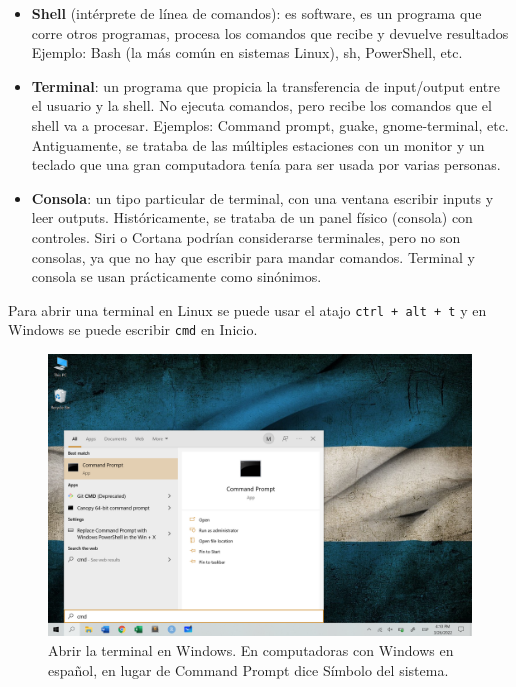 \documentclass[
]{book}
\providecommand{\tightlist}{%
  \setlength{\itemsep}{0pt}\setlength{\parskip}{0pt}}
\begin{document}
\begin{itemize}
\tightlist
\item
  \textbf{Shell} (intérprete de línea de comandos): es software, es un programa que corre otros programas, procesa los comandos que recibe y devuelve resultados Ejemplo: Bash (la más común en sistemas Linux), sh, PowerShell, etc.
\item
  \textbf{Terminal}: un programa que propicia la transferencia de input/output entre el usuario y la shell. No ejecuta comandos, pero recibe los comandos que el shell va a procesar. Ejemplos: Command prompt, guake, gnome-terminal, etc. Antiguamente, se trataba de las múltiples estaciones con un monitor y un teclado que una gran computadora tenía para ser usada por varias personas.
\item
  \textbf{Consola}: un tipo particular de terminal, con una ventana escribir inputs y leer outputs. Históricamente, se trataba de un panel físico (consola) con controles. Siri o Cortana podrían considerarse terminales, pero no son consolas, ya que no hay que escribir para mandar comandos. Terminal y consola se usan prácticamente como sinónimos.
\end{itemize}

Para abrir una terminal en Linux se puede usar el atajo \texttt{ctrl\ +\ alt\ +\ t} y en Windows se puede escribir \texttt{cmd} en Inicio.

\begin{figure}

{\centering \includegraphics[width=0.8\linewidth]{images/07_otros/terminal} 

}

\caption{Abrir la terminal en Windows. En computadoras con Windows en español, en lugar de Command Prompt dice Símbolo del sistema.}\label{fig:unnamed-chunk-169}
\end{figure}
\end{document}
